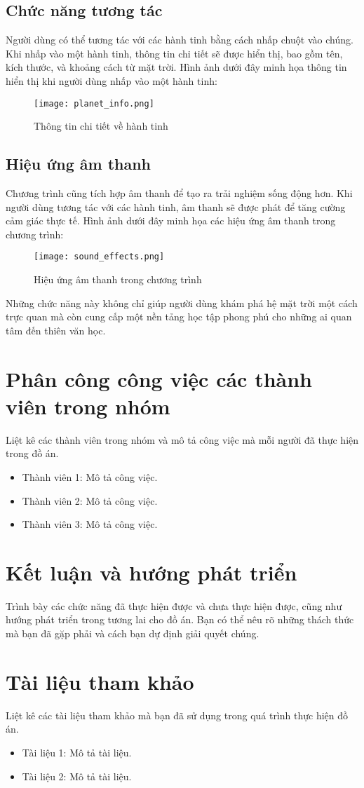 \documentclass[14pt]{extarticle}
\begin{document}
\subsection{Chức năng tương tác}
Người dùng có thể tương tác với các hành tinh bằng cách nhấp chuột vào chúng. Khi nhấp vào một hành tinh, thông tin chi tiết sẽ được hiển thị, bao gồm tên, kích thước, và khoảng cách từ mặt trời. Hình ảnh dưới đây minh họa thông tin hiển thị khi người dùng nhấp vào một hành tinh:

\begin{figure}[h]
    \centering
    \texttt{[image: planet\_info.png]}
    \caption{Thông tin chi tiết về hành tinh}
    \label{fig:planet_info}
\end{figure}

\subsection{Hiệu ứng âm thanh}
Chương trình cũng tích hợp âm thanh để tạo ra trải nghiệm sống động hơn. Khi người dùng tương tác với các hành tinh, âm thanh sẽ được phát để tăng cường cảm giác thực tế. Hình ảnh dưới đây minh họa các hiệu ứng âm thanh trong chương trình:

\begin{figure}[h]
    \centering
    \texttt{[image: sound\_effects.png]}
    \caption{Hiệu ứng âm thanh trong chương trình}
    \label{fig:sound_effects}
\end{figure}

Những chức năng này không chỉ giúp người dùng khám phá hệ mặt trời một cách trực quan mà còn cung cấp một nền tảng học tập phong phú cho những ai quan tâm đến thiên văn học.
\section{Phân công công việc các thành viên trong nhóm}
Liệt kê các thành viên trong nhóm và mô tả công việc mà mỗi người đã thực hiện trong đồ án.
\begin{itemize}
    \item Thành viên 1: Mô tả công việc.
    \item Thành viên 2: Mô tả công việc.
    \item Thành viên 3: Mô tả công việc.
\end{itemize}
\section{Kết luận và hướng phát triển}
Trình bày các chức năng đã thực hiện được và chưa thực hiện được, cũng như hướng phát triển trong tương lai cho đồ án. Bạn có thể nêu rõ những thách thức mà bạn đã gặp phải và cách bạn dự định giải quyết chúng.
\section{Tài liệu tham khảo}
Liệt kê các tài liệu tham khảo mà bạn đã sử dụng trong quá trình thực hiện đồ án.
\begin{itemize}
    \item Tài liệu 1: Mô tả tài liệu.
    \item Tài liệu 2: Mô tả tài liệu.
\end{itemize}
\end{document}
